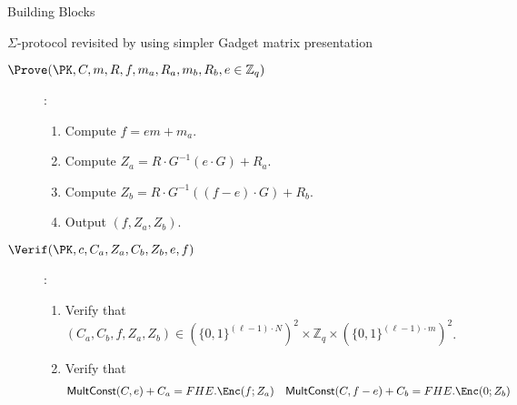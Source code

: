 \begin{section}{Building Blocks}
\begin{subsection}{$\Sigma$-protocol revisited by using simpler Gadget matrix presentation}
\begin{description}
    \item[$\Prove(\PK, C, m, R, f, m_a, R_a, m_b, R_b, e \in \mathbb{Z}_q)$]:
      \begin{enumerate}
      \item Compute $f = em +m_a$.
      \item Compute $Z_a = R \cdot G^{-1}(e \cdot G) + R_a$.
      \item Compute $Z_b = R \cdot G^{-1}((f-e) \cdot G) + R_b$.
      \item Output $(f, Z_a, Z_b)$.
      \end{enumerate}
      
    \item[$\Verif(\PK, c, C_a, Z_a, C_b, Z_b, e, f)$]:
      \begin{enumerate}
      \item Verify that $(C_a, C_b, f, Z_a, Z_b) \in (\{0,1\}^{(\ell-1) \cdot N})^2 \times \mathbb{Z}_q \times (\{0,1\}^{(\ell-1)\cdot m})^2$.
      \item Verify that
        \begin{align*}
          {\mathsf{MultConst}}(C, e)+C_a &= FHE.\Enc(f; Z_a) & {\mathsf{MultConst}}(C, f-e) + C_b &= FHE.\Enc(0; Z_b)
        \end{align*}
      \end{enumerate}
    \end{description}
  \end{subsection}



\end{section}
